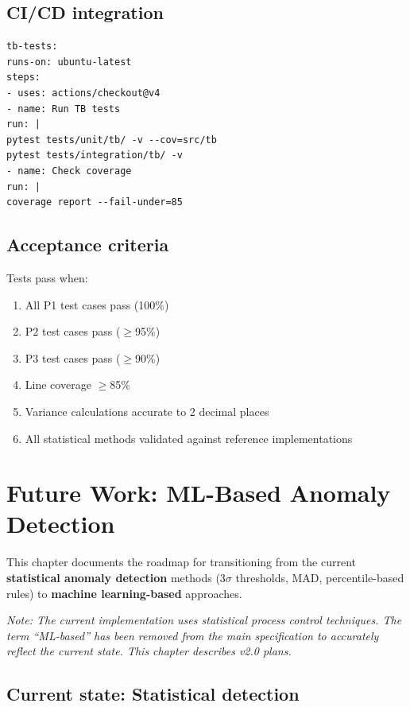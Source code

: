 \documentclass[11pt,a4paper,twoside]{report}
\begin{document}
\section{CI/CD integration}

\begin{lstlisting}[basicstyle=\ttfamily\small,caption={GitHub Actions workflow excerpt.}]
tb-tests:
runs-on: ubuntu-latest
steps:
- uses: actions/checkout@v4
- name: Run TB tests
run: |
pytest tests/unit/tb/ -v --cov=src/tb
pytest tests/integration/tb/ -v
- name: Check coverage
run: |
coverage report --fail-under=85
\end{lstlisting}

\section{Acceptance criteria}

Tests pass when:
\begin{enumerate}
\item All P1 test cases pass (100\%)
\item P2 test cases pass ($\geq$95\%)
\item P3 test cases pass ($\geq$90\%)
\item Line coverage $\geq$85\%
\item Variance calculations accurate to 2 decimal places
\item All statistical methods validated against reference implementations
\end{enumerate}
\chapter{Future Work: ML-Based Anomaly Detection}\label{ch:future-ml}

This chapter documents the roadmap for transitioning from the current
\textbf{statistical anomaly detection} methods (3$\sigma$ thresholds, MAD,
percentile-based rules) to \textbf{machine learning-based} approaches.

\textit{Note: The current implementation uses statistical process control
techniques. The term ``ML-based'' has been removed from the main specification
to accurately reflect the current state. This chapter describes v2.0 plans.}

\section{Current state: Statistical detection}
\end{document}
